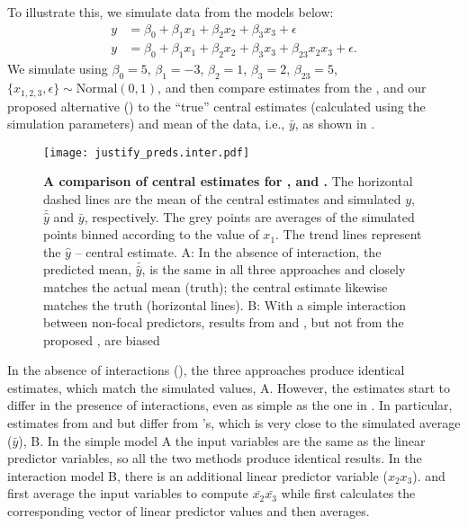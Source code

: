To illustrate this, we simulate data from the models below:
%
\begin{align}
y &= \beta_0 + \beta_1x_1 + \beta_2x_2 + \beta_3x_3 + \epsilon \label{eq:simple_inter_higher_no_interaction}\\
y &= \beta_0 + \beta_1x_1 + \beta_2x_2 + \beta_3x_3 + \beta_{23}x_2x_3 + \epsilon \label{eq:simple_inter_higher}.
\end{align}
%
We simulate using $\beta_0 = 5$, $\beta_1 = -3$, $\beta_2 = 1$, $\beta_3 = 2$, $\beta_{23} = 5$, $\{x_{1,2,3}, \epsilon\} \sim \mathrm{Normal}(0, 1)$, and then compare estimates from the ,  and our proposed alternative () to the ``true'' central estimates (calculated using the simulation parameters) and mean of the data, i.e., $\bar{y}$, as shown in .
%
\begin{figure}
\begin{center}
\texttt{[image: justify\_preds.inter.pdf]}
\end{center}
\caption{{\bf A comparison of central estimates for ,  and .} The horizontal dashed lines are the mean of the central estimates and simulated $y$, $\bar{\hat{y}}$ and $\bar{y}$, respectively. The grey points are averages of the simulated points binned according to the value of $x_1$. The trend lines represent the $\hat{y}$ -- central estimate. A: In the absence of interaction, the predicted mean, $\bar{\hat{y}}$, is the same in all three approaches and closely matches the actual mean (truth); the central estimate likewise matches the truth (horizontal lines). B: With a simple interaction between non-focal predictors, results from  and , but not from the proposed , are biased}
\label{fig:justify_plots}
\end{figure}
%
In the absence of interactions (), the three approaches produce identical estimates, which match the simulated values, A. However, the estimates start to differ in the presence of interactions, even as simple as the one in . In particular, estimates from  and  but differ from 's, which is very close to the simulated average ($\bar{y}$), B.
In the simple model A the input variables are the same as the linear predictor variables, so all the two methods produce identical results.
In the interaction model B, there is an additional linear predictor variable ($x_2x_3$).  and  first average the input variables to compute $\bar{x_2}\bar{x_3}$ while  first calculates the corresponding vector of linear predictor values and then averages.

